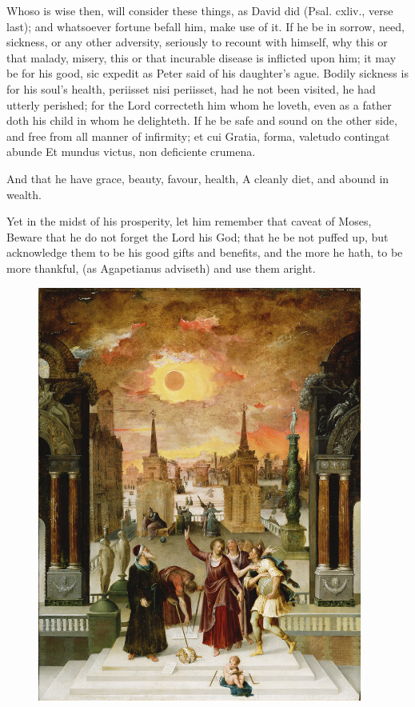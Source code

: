 {Whoso is wise then, will consider these things, as David did (Psal. cxliv., verse last); and whatsoever fortune befall him, make use of it.
If he be in sorrow, need, sickness, or any other adversity, seriously to recount with himself, why this or that malady, misery, this or that incurable disease is inflicted upon him; it may be for his good, sic expedit as Peter said of his daughter's ague.
Bodily sickness is for his soul's health, periisset nisi periisset, had he not been visited, he had utterly perished; for the Lord correcteth him whom he loveth, even as a father doth his child in whom he delighteth.
If he be safe and sound on the other side, and free from all manner of infirmity; et cui Gratia, forma, valetudo contingat abunde Et mundus victus, non deficiente crumena.

And that he have grace, beauty, favour, health,
A cleanly diet, and abound in wealth.

Yet in the midst of his prosperity, let him remember that caveat of
Moses, Beware that he do not forget the Lord his God; that he be
not puffed up, but acknowledge them to be his good gifts and benefits,
and the more he hath, to be more thankful, (as Agapetianus
adviseth) and use them aright.

\cleartoleftpage{}
\begin{figure}[p]
  \begingroup
  \centering
  \includegraphics[keepaspectratio,width=0.95\textwidth]{figures/caron-dionysius-converts-pagans-small.jpg}
  \label{fig:dionysiusconvertspagans}
\end{figure}
\restoregeometry

}
